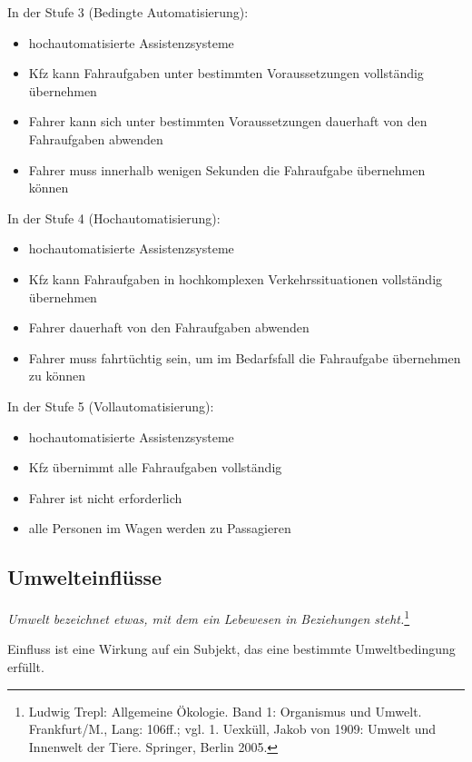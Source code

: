 In der Stufe 3 (Bedingte Automatisierung):
\begin{itemize}
	\item hochautomatisierte Assistenzsysteme
	\item \ac{Kfz} kann Fahraufgaben unter bestimmten Voraussetzungen vollständig übernehmen
	\item Fahrer kann sich unter bestimmten Voraussetzungen dauerhaft von den Fahraufgaben abwenden
	\item Fahrer muss innerhalb wenigen Sekunden die Fahraufgabe übernehmen können
\end{itemize}

In der Stufe 4 (Hochautomatisierung):
\begin{itemize}
	\item hochautomatisierte Assistenzsysteme
	\item \ac{Kfz} kann Fahraufgaben in hochkomplexen Verkehrssituationen vollständig übernehmen
	\item Fahrer dauerhaft von den Fahraufgaben abwenden
	\item Fahrer muss fahrtüchtig sein, um im Bedarfsfall die Fahraufgabe übernehmen zu können
\end{itemize}

In der Stufe 5 (Vollautomatisierung):
\begin{itemize}
	\item hochautomatisierte Assistenzsysteme
	\item \ac{Kfz} übernimmt alle Fahraufgaben vollständig
	\item Fahrer ist nicht erforderlich
	\item alle Personen im Wagen werden zu Passagieren
\end{itemize}


\subsection{Umwelteinflüsse}

\textit{Umwelt bezeichnet etwas, mit dem ein Lebewesen in Beziehungen steht.}\footnote{Ludwig Trepl: Allgemeine Ökologie. Band 1: Organismus und Umwelt. Frankfurt/M., Lang: 106ff.; vgl. 1. Uexküll, Jakob von 1909: Umwelt und Innenwelt der Tiere. Springer, Berlin 2005.}

Einfluss ist eine Wirkung auf ein Subjekt, das eine bestimmte Umweltbedingung erfüllt.

